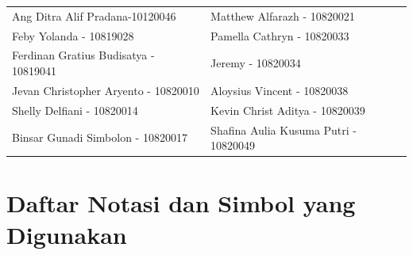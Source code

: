 \documentclass[
]{book}
\begin{document}
\begin{longtable}[]{@{}
  >{\raggedright\arraybackslash}p{}
  >{\raggedright\arraybackslash}p{}@{}}
\toprule\noalign{}
\endhead
\bottomrule\noalign{}
\endlastfoot
Ang Ditra Alif Pradana-10120046 & Matthew Alfarazh - 10820021 \\
Feby Yolanda - 10819028 & Pamella Cathryn - 10820033 \\
Ferdinan Gratius Budisatya - 10819041 & Jeremy - 10820034 \\
Jevan Christopher Aryento - 10820010 & Aloysius Vincent - 10820038 \\
Shelly Delfiani - 10820014 & Kevin Christ Aditya - 10820039 \\
Binsar Gunadi Simbolon - 10820017 & Shafina Aulia Kusuma Putri - 10820049 \\
\end{longtable}

\hypertarget{daftar-notasi-dan-simbol-yang-digunakan}{%
\section*{Daftar Notasi dan Simbol yang Digunakan}\label{daftar-notasi-dan-simbol-yang-digunakan}}
\end{document}
